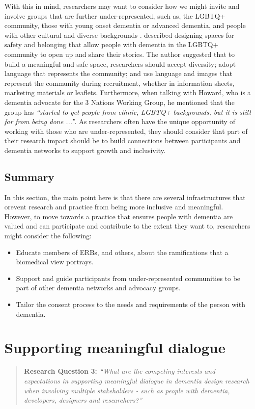 With this in mind, researchers may want to consider how we might invite and involve groups that are further under-represented, such as, the LGBTQ+ community, those with young onset dementia or advanced dementia, and people with other cultural and diverse backgrounds \citep{foley_struggle_2019, bryden_before_2015}. \cite{mcgovern2014forgotten} described designing spaces for safety and belonging that allow people with dementia in the LGBTQ+ community to open up and share their stories. The author suggested that to build a meaningful and safe space, researchers should accept diversity; adopt language that represents the community; and use language and images that represent the community during recruitment, whether in information sheets, marketing materials or leaflets. Furthermore, when talking with Howard, who is a dementia advocate for the 3 Nations Working Group, he mentioned that the group has \textit{``started to get people from ethnic, LGBTQ+ backgrounds, but it is still far from being done ...''}. As researchers often have the unique opportunity of working with those who are under-represented, they should consider that part of their research impact should be to build connections between participants and dementia networks to support growth and inclusivity.

\subsection{Summary}
\label{EthicsSummary}
In this section, the main point here is that there are several infrastructures that orevent research and practice from being more inclusive and meaningful. However, to move towards a practice that ensures people with dementia are valued and can participate and contribute to the extent they want to, researchers might consider the following:
\begin{itemize}
    \item Educate members of ERBs, and others, about the ramifications that a biomedical view portrays.
    \item Support and guide participants from under-represented communities to be part of other dementia networks and advocacy groups.
    \item Tailor the consent process to the needs and requirements of the person with dementia.
\end{itemize}

\section{Supporting meaningful dialogue}
\label{Discussion:RQ3}
\begin{quote}
\textbf{    Research Question 3:
}    
\textit{ “What are the competing interests and expectations in supporting meaningful dialogue in dementia design research when involving multiple stakeholders - such as people with dementia, developers, designers and researchers?”}
\end{quote}

